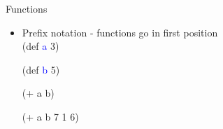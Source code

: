\documentclass{beamer}
\begin{document}
\begin{frame}{Functions}
  \begin{itemize}
  \item Prefix notation - functions go in first position\\
{\ttfamily\color{black}
%
\textcolor[rgb]{0.54901963,0.54901963,0.54901963}{(}\textcolor[rgb]{0.49803922,0.0,0.49803922}{def}
\textcolor{blue}{a}
3\textcolor[rgb]{0.54901963,0.54901963,0.54901963}{)}}

{\ttfamily\color{black}
\textcolor[rgb]{0.54901963,0.54901963,0.54901963}{(}\textcolor[rgb]{0.49803922,0.0,0.49803922}{def}
\textcolor{blue}{b}
5\textcolor[rgb]{0.54901963,0.54901963,0.54901963}{)}}

{\ttfamily\color{black}
\textcolor[rgb]{0.54901963,0.54901963,0.54901963}{(}\textcolor[rgb]{0.28235295,0.23921569,0.54509807}{+}
a b\textcolor[rgb]{0.54901963,0.54901963,0.54901963}{)}}

{\ttfamily\color{black}
\textcolor[rgb]{0.54901963,0.54901963,0.54901963}{(}\textcolor[rgb]{0.28235295,0.23921569,0.54509807}{+}
a b 7 1 6\textcolor[rgb]{0.54901963,0.54901963,0.54901963}{)}}
  \end{itemize}
\end{frame}
\end{document}
